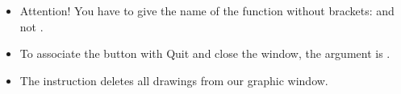 \documentclass[11pt,class=report,crop=false]{standalone}
\begin{document}
\begin{cours}
\begin{itemize}
  \item Attention! You have to give the name of the function without brackets:  and not .
  
  \item To associate the button with \og{}Quit\fg{} and close the window, the argument is .
  
  \item The instruction  deletes all drawings from our graphic window.
  
\end{itemize}
\end{cours}


\end{document}
